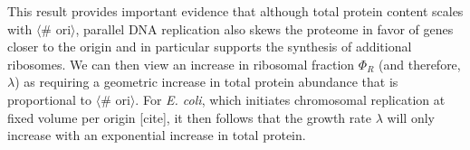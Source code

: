 
%
%
%
%
%

This result provides important evidence that although total protein content
scales with $\langle$\# ori$\rangle$, parallel DNA replication also skews the
proteome in favor of genes closer to the origin and in particular supports the
synthesis of additional ribosomes.   We can then view an increase in ribosomal
fraction $\Phi_R$ (and therefore, $\lambda$) as requiring a geometric increase
in total protein abundance that is proportional to $\langle$\# ori$\rangle$. For
\textit{E. coli}, which initiates chromosomal replication at fixed volume per
origin [cite], it then follows that the growth rate $\lambda$ will only increase
with an exponential increase in total protein.

